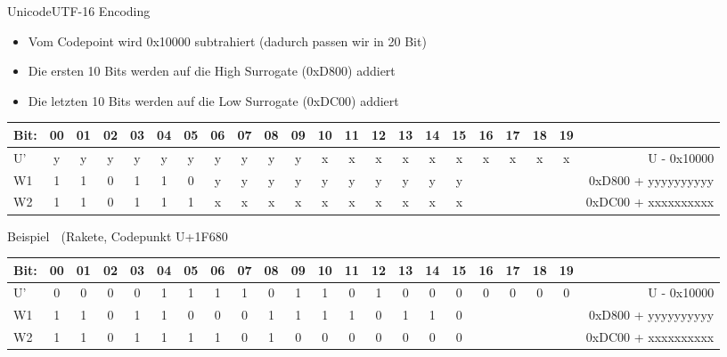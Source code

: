 \documentclass[xelatex,aspectratio=169]{beamer}
\begin{document}
\begin{frame}{Unicode}{UTF-16 Encoding}
    \begin{itemize}
        \item Vom Codepoint wird 0x10000 subtrahiert (dadurch passen wir in 20 Bit)
        \item Die ersten 10 Bits werden auf die High Surrogate
              (0xD800) addiert
        \item Die letzten 10 Bits werden auf die Low Surrogate
              (0xDC00) addiert
    \end{itemize}
    \setlength{\tabcolsep}{0.2em}
    \centering
    \small
    \begin{tabular}{lccccccccccccccccccccr}
        \toprule
        Bit: & 00 & 01 & 02 & 03 & 04 & 05 & 06 & 07 & 08 & 09 & 10 & 11 & 12 & 13 & 14 & 15 & 16 & 17 & 18 & 19 &                     \\
        \midrule
        U'   & y  & y  & y  & y  & y  & y  & y  & y  & y  & y  & x  & x  & x  & x  & x  & x  & x  & x  & x  & x  & U - 0x10000         \\
        W1   & 1  & 1  & 0  & 1  & 1  & 0  & y  & y  & y  & y  & y  & y  & y  & y  & y  & y  &    &    &    &    & 0xD800 + yyyyyyyyyy \\
        W2   & 1  & 1  & 0  & 1  & 1  & 1  & x  & x  & x  & x  & x  & x  & x  & x  & x  & x  &    &    &    &    & 0xDC00 + xxxxxxxxxx \\
        \bottomrule
    \end{tabular}

    \begin{exampleblock}{Beispiel {\symbolfont 🚀} (Rakete, Codepunkt U+1F680}

        \centering
        \small
        \begin{tabular}{lccccccccccccccccccccr}
            \toprule
            Bit: & 00 & 01 & 02 & 03 & 04 & 05 & 06 & 07 & 08 & 09 & 10 & 11 & 12 & 13 & 14 & 15 & 16 & 17 & 18 & 19 &                     \\
            \midrule
            U'   & 0  & 0  & 0  & 0  & 1  & 1  & 1  & 1  & 0  & 1  & 1  & 0  & 1  & 0  & 0  & 0  & 0  & 0  & 0  & 0  & U - 0x10000         \\
            W1   & 1  & 1  & 0  & 1  & 1  & 0  & 0  & 0  & 1  & 1  & 1  & 1  & 0  & 1  & 1  & 0  &    &    &    &    & 0xD800 + yyyyyyyyyy \\
            W2   & 1  & 1  & 0  & 1  & 1  & 1  & 1  & 0  & 1  & 0  & 0  & 0  & 0  & 0  & 0  & 0  &    &    &    &    & 0xDC00 + xxxxxxxxxx \\
            \bottomrule
        \end{tabular}
    \end{exampleblock}
\end{frame}
\end{document}

